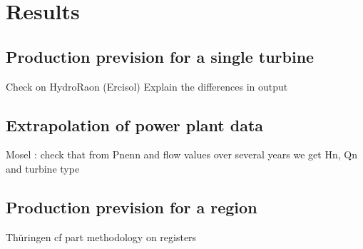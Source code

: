 \chapter{Results}
\label{chap:results}
\section{Production prevision for a single turbine}
\label{sec:res_single}
Check on HydroRaon (Ercisol) \newline
Explain the differences in output


\section{Extrapolation of power plant data}
\label{missing_data}
Mosel : check that from Pnenn and flow values over several years we get Hn, Qn and turbine type

\section{Production prevision for a region}
Thüringen cf part methodology on registers